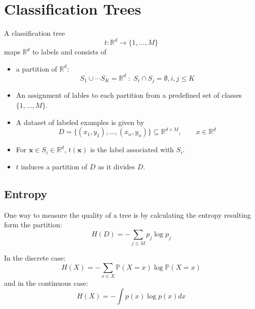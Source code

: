 \section{Classification Trees}
A classification tree
\noindent\begin{equation*}
    t: \mathbb{R}^d \to \{1,\ldots, M\}
\end{equation*}
maps $\mathbb{R}^d$ to labels and consists of
\begin{itemize}
    \item a partition of $\mathbb{R}^d$:
          \noindent\begin{equation*}
              S_1\cup \cdots S_K = \mathbb{R}^d \;:\; S_i\cap S_j=\emptyset , i,j\leq K
          \end{equation*}
    \item An assignment of lables to each partition from a predefined set of classes $\{1,\ldots, M\}$.
    \item A dataset of labeled examples is given by
          \noindent\begin{equation*}
              D=\{(x_{1},y_{1}),\ldots,(x_{n},y_{n})\}\subseteq\mathbb{R}^{d\times M},\qquad x\in \mathbb{R}^d
          \end{equation*}
\end{itemize}


\begin{itemize}
    \item For $\mathbf{x}\in S_i\in\mathbb{R}^d$, $t(\mathbf{x})$ is the label associated with $S_i$.
    \item $t$ induces a partition of $D$ as it divides $D$.
\end{itemize}


\subsection{Entropy}
One way to measure the quality of a tree is by calculating the entropy resulting form the partition:
\noindent\begin{equation*}
    H(D)=-\sum_{j\leq M}p_j\log p_j
\end{equation*}

In the discrete case:
\noindent\begin{equation*}
    H(X)=-\sum_{x\in X}\mathbb{P}(X=x)\log\mathbb{P}(X=x)
\end{equation*}
and in the continuous case:
\noindent\begin{equation*}
    H(X)=-\int p(x)\log p(x) dx
\end{equation*}

